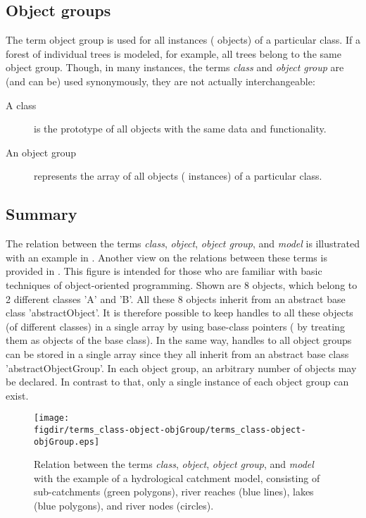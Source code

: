 \subsection{Object groups} \label{sec:concept-terms-objectgroups}

The term object group is used for all instances (\ie{} objects) of a particular class. If a forest of individual trees is modeled, for example, all trees belong to the same object group. Though, in many instances, the terms \emph{class} and \emph{object group} are (and can be) used synonymously, they are not actually interchangeable:
\begin{description}
  \item [A class] is the prototype of all objects with the same data and functionality.
  \item [An object group] represents the array of all objects (\ie{} instances) of a particular class.
\end{description}

\subsection{Summary} \label{sec:concept-terms-summary}

The relation between the terms \emph{class}, \emph{object}, \emph{object group}, and \emph{model} is illustrated with an example in . Another view on the relations between these terms is provided in . This figure is intended for those who are familiar with basic techniques of object-oriented programming. Shown are 8 objects, which belong to 2 different classes 'A' and 'B'. All these 8 objects inherit from an abstract base class 'abstractObject'. It is therefore possible to keep handles to all these objects (of different classes) in a single array by using base-class pointers (\ie{} by treating them as objects of the base class). In the same way, handles to all object groups can be stored in a single array since they all inherit from an abstract base class 'abstractObjectGroup'. In each object group, an arbitrary number of objects may be declared. In contrast to that, only a single instance of each object group can exist.


\begin{figure}
  \centering
  \texttt{[image: \\figdir/terms\_class-object-objGroup/terms\_class-object-objGroup.eps]}
  \caption[Relation between the terms \emph{class}, \emph{object}, \emph{object group}, and \emph{model}.]{Relation between the terms \emph{class}, \emph{object}, \emph{object group}, and \emph{model} with the example of a hydrological catchment model, consisting of sub-catchments (green polygons), river reaches (blue lines), lakes (blue polygons), and river nodes (circles). \label{fig:concept-terms}}
\end{figure}

